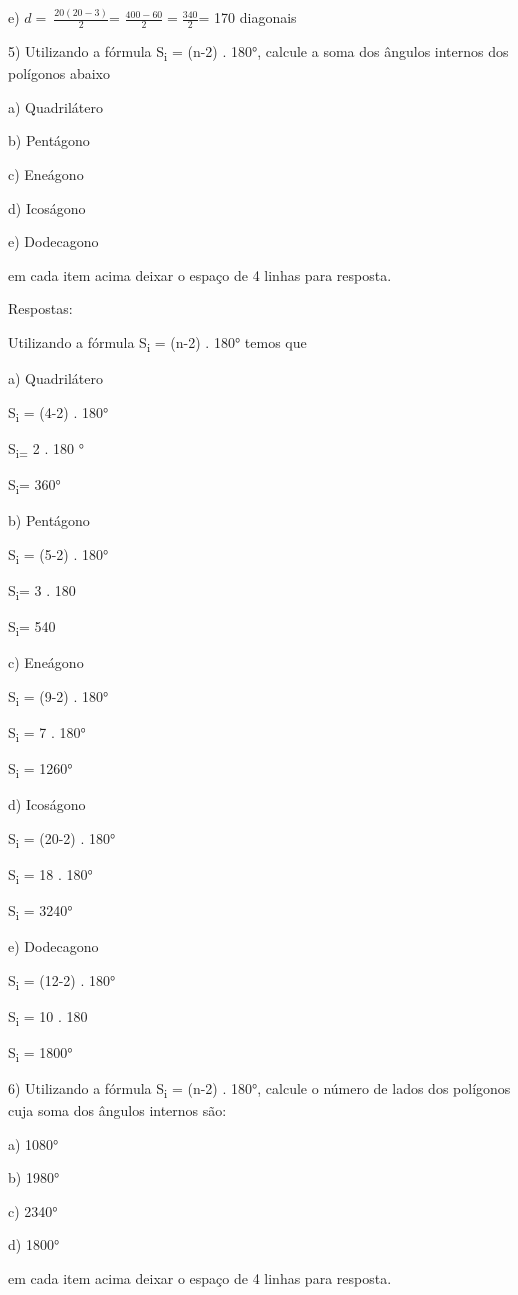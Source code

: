 e) \(d = \ \frac{20(20 - 3)}{2}\)=
\(\frac{400 - 60}{2} = \frac{340}{2}\)= 170 diagonais

5) Utilizando a fórmula S\textsubscript{i} = (n-2) . 180°, calcule a
soma dos ângulos internos dos polígonos abaixo

a) Quadrilátero

b) Pentágono

c) Eneágono

d) Icoságono

e) Dodecagono

em cada item acima deixar o espaço de 4 linhas para resposta.

Respostas:

Utilizando a fórmula S\textsubscript{i} = (n-2) . 180° temos que

a) Quadrilátero

S\textsubscript{i} = (4-2) . 180°

S\textsubscript{i=} 2 . 180 °

S\textsubscript{i}= 360°

b) Pentágono

S\textsubscript{i} = (5-2) . 180°

S\textsubscript{i}= 3 . 180

S\textsubscript{i}= 540

c) Eneágono

S\textsubscript{i} = (9-2) . 180°

S\textsubscript{i} = 7 . 180°

S\textsubscript{i} = 1260°

d) Icoságono

S\textsubscript{i} = (20-2) . 180°

S\textsubscript{i} = 18 . 180°

S\textsubscript{i} = 3240°

e) Dodecagono

S\textsubscript{i} = (12-2) . 180°

S\textsubscript{i} = 10 . 180

S\textsubscript{i} = 1800°

6) Utilizando a fórmula S\textsubscript{i} = (n-2) . 180°, calcule o
número de lados dos polígonos cuja soma dos ângulos internos são:

a) 1080°

b) 1980°

c) 2340°

d) 1800°

em cada item acima deixar o espaço de 4 linhas para resposta.

